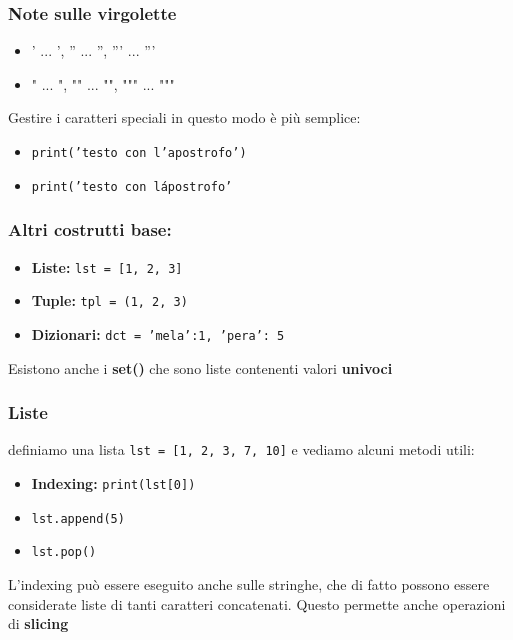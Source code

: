 \documentclass{beamer}
\begin{document}
\begin{frame}
    
    \frametitle{Note sulle virgolette}
  
    \begin{itemize}
        \item ' ... ', '' ... '', ''' ... '''
        \item " ... ", "" ... "", """ ... """
    \end{itemize}

Gestire i caratteri speciali in questo modo è più semplice:

    \begin{itemize}
        \item \texttt{print('testo con l'apostrofo')}
        \item \texttt{print('testo con l\'apostrofo'}
    \end{itemize}

\end{frame}

\begin{frame}
    
    \frametitle{Altri costrutti base:}

    \begin{itemize}
        \item \textbf{Liste:} \texttt{lst = [1, 2, 3]}
        \item \textbf{Tuple:} \texttt{tpl = (1, 2, 3)}
        \item \textbf{Dizionari:} \texttt{dct = {'mela':1, 'pera': 5}}
    \end{itemize}

    Esistono anche i \textbf{set()} che sono liste contenenti valori \textbf{univoci}

\end{frame}


\begin{frame}
    
    \frametitle{Liste}
    definiamo una lista
    \texttt{lst = [1, 2, 3, 7, 10]}
    e vediamo alcuni metodi utili:
    \begin{itemize}
        \item \textbf{Indexing:} \texttt{print(lst[0])}
        \item \texttt{lst.append(5)}
        \item \texttt{lst.pop()}
    \end{itemize}

    L'indexing può essere eseguito anche sulle stringhe, che di fatto possono essere considerate liste di tanti caratteri concatenati.
    Questo permette anche operazioni di \textbf{slicing}

\end{frame}
\end{document}
